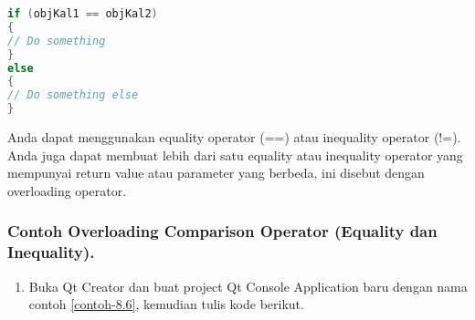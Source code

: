 \begin{lstlisting}[language=c++, numbers=none]
if (objKal1 == objKal2)
{
// Do something
}
else
{
// Do something else
}
\end{lstlisting}

Anda dapat menggunakan equality operator (==) atau inequality operator
(!=). Anda juga dapat membuat lebih dari satu equality atau inequality
operator yang mempunyai return value atau parameter yang berbeda, ini
disebut dengan overloading operator.

\subsubsection*{Contoh  Overloading Comparison Operator (Equality dan Inequality).}

\begin{enumerate}
\def\labelenumi{\arabic{enumi}.}
\item
  Buka Qt Creator dan buat project Qt Console Application baru dengan
  nama contoh \ref{contoh-8.6}, kemudian tulis kode berikut.


\end{enumerate}
